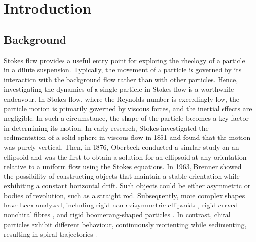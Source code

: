 \documentclass[12pt,MSc,twoside]{muthesis_2020}
\begin{document}
\chapter{Introduction}
\section{Background}
Stokes flow provides a useful entry point for exploring the rheology of a particle in a dilute suspension. Typically, the movement of a particle is governed by its interaction with the background flow rather than with other particles. Hence, investigating the dynamics of a single particle in Stokes flow is a worthwhile endeavour. In Stokes flow, where the Reynolds number is exceedingly low, the particle motion is primarily governed by viscous forces, and the inertial effects are negligible. In such a circumstance, the shape of the particle becomes a key factor in determining its motion. In early research, Stokes \cite{stokes1851effect} investigated the sedimentation of a solid sphere in viscous flow in 1851 and found that the motion was purely vertical. Then, in 1876, Oberbeck \cite{oberbeck1876ueber} conducted a similar study on an ellipsoid and was the first to obtain a solution for an ellipsoid at any orientation relative to a uniform flow using the Stokes equations. In 1963, Brenner \cite{brenner1963stokes} showed the possibility of constructing objects that maintain a stable orientation while exhibiting a constant horizontal drift. Such objects could be either asymmetric or bodies of revolution, such as a straight rod. Subsequently, more complex shapes have been analysed, including rigid non-axisymmetric ellipsoids \cite{hinch1979rotation}, rigid curved nonchiral fibres \cite{wang2012flipping}, and rigid boomerang-shaped particles \cite{roggeveen2022motion}. In contrast, chiral particles exhibit different behaviour, continuously reorienting while sedimenting, resulting in spiral trajectories \cite{doi2005motion}. 
\end{document}
